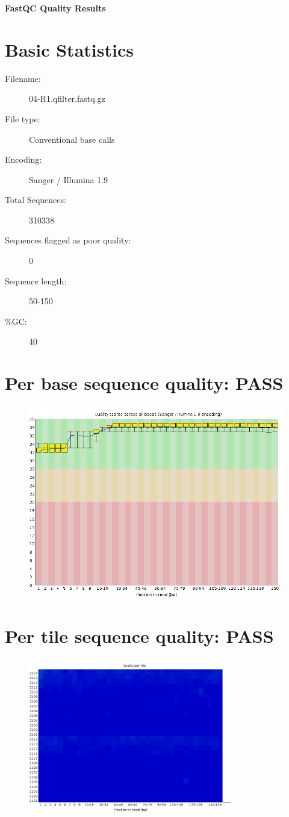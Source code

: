 \documentclass{article}
\begin{document}
\begin{center}
\Large{\textbf{FastQC Quality Results}}
\end{center}
\section{Basic Statistics}
\begin{description}
\item[Filename:]
04{-}R1.qfilter.fastq.gz
\item[File type:]
Conventional base calls
\item[Encoding:]
Sanger / Illumina 1.9
\item[Total Sequences:]
310338
\item[Sequences flagged as poor quality:]
0
\item[Sequence length:]
50{-}150
\item[\%GC:]
40
\end{description}


\section{Per base sequence quality: PASS}


\begin{figure}[htbp]
\centering
\includegraphics[width=60.0	extwidth]{04-R1.qfilter_fastqc/Images/per_base_quality.png}
\end{figure}


\section{Per tile sequence quality: PASS}


\begin{figure}[htbp]
\centering
\includegraphics[width=0.8\textwidth]{04-R1.qfilter_fastqc/Images/per_tile_quality.png}
\end{figure}
\end{document}
